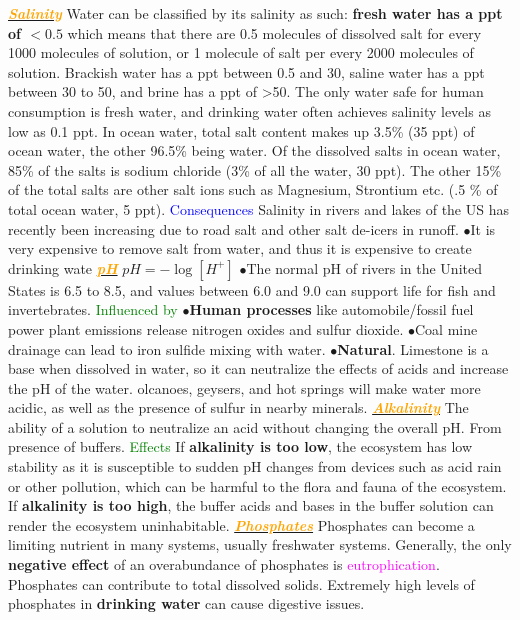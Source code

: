 \documentclass{article}
\newcommand{\ddd}{$\bullet$}
\newcommand{\green}[1]{\textcolor{green}{#1}}
\newcommand{\blue}[1]{\textcolor{blue}{#1}}
\newcommand{\pink}[1]{\textcolor{magenta}{#1}}
\newcommand{\orange}[1]{\textcolor{orange}{#1}}
\newcommand{\mysubsection}[1]{\underline{\textbf{{\textit{\orange{#1}}}}}}
\newcommand{\mysubsub}[1]{{{\green{#1}}}}
\newcommand{\mysubsubsub}[1]{{{\blue{#1}}}}
\begin{document}
\begin{multicols*}{4}
        \mysubsection{Salinity}
            Water can be classified by its salinity as such: \textbf{fresh water has a ppt of $< 0.5$} which means that there are 0.5 molecules of dissolved salt for every 1000 molecules of solution, or 1 molecule of salt per every 2000 molecules of solution. Brackish water has a ppt between 0.5 and 30, saline water has a ppt between 30 to 50, and brine has a ppt of >50. The only water safe for human consumption is fresh water, and drinking water often achieves salinity levels as low as 0.1 ppt. In ocean water, total salt content makes up 3.5\% (35 ppt) of ocean water, the other 96.5\% being water. Of the dissolved salts in ocean water, 85\% of the salts is sodium chloride (3\% of all the water, 30 ppt). The other 15\% of the total salts are other salt ions such as Magnesium, Strontium etc. (.5 \% of total ocean water, 5 ppt). 
            \mysubsubsub{Consequences}
                Salinity in rivers and lakes of the US has recently been increasing due to road salt and other salt de-icers in runoff. \ddd It is very expensive to remove salt from water, and thus it is expensive to create drinking wate
        \mysubsection{pH}
            $pH = - \log [H^+]$
            \ddd  The normal pH of rivers in the United States is 6.5 to 8.5, and values between 6.0 and 9.0 can support life for fish and invertebrates.
            \mysubsub{Influenced by} 
            \ddd \textbf{Human processes} like automobile/fossil fuel power plant emissions release nitrogen oxides and sulfur dioxide.
            \ddd  Coal mine drainage can lead to iron sulfide mixing with water.
            \ddd \textbf{Natural}. Limestone is a base when dissolved in water, so it can neutralize the effects of acids and increase the pH of the water. olcanoes, geysers, and hot springs will make water more acidic, as well as the presence of sulfur in nearby minerals.
        \mysubsection{Alkalinity}
            The ability of a solution to neutralize an acid without changing the overall pH. From presence of buffers. 
            \mysubsub{Effects} If \textbf{alkalinity is too low}, the ecosystem has low stability as it is susceptible to sudden pH changes from devices such as acid rain or other pollution, which can be harmful to the flora and fauna of the ecosystem. If \textbf{alkalinity is too high}, the buffer acids and bases in the buffer solution can render the ecosystem uninhabitable.
        \mysubsection{Phosphates}
            Phosphates can become a limiting nutrient in many systems, usually freshwater systems. Generally, the only \textbf{negative effect} of an overabundance of phosphates is \pink{eutrophication}. Phosphates can contribute to total dissolved solids. Extremely high levels of phosphates in \textbf{drinking water} can cause digestive issues. 

\end{multicols*}
\end{document}
